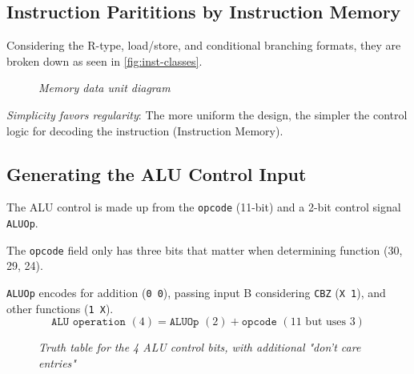 \documentclass[11pt]{article}
\begin{document}
\subsection*{Instruction Parititions by Instruction Memory}

Considering the R-type, load/store, and conditional branching formats, they are broken down as seen in \autoref{fig:inst-classes}.

\begin{figure}[htbp]
    \centering
    \caption{\textit{Memory data unit diagram}}
    \label{fig:inst-classes}
\end{figure}

\textit{Simplicity favors regularity}: The more uniform the design, the simpler the control logic for decoding the instruction (Instruction Memory).

\subsection*{Generating the ALU Control Input}

The ALU control is made up from the \texttt{opcode} (11-bit) and a 2-bit control signal \texttt{ALUOp}.

The \texttt{opcode} field only has three bits that matter when determining function (30, 29, 24).

\texttt{ALUOp} encodes for addition (\texttt{0 0}), passing input B considering \texttt{CBZ} (\texttt{X 1}), and other functions (\texttt{1 X}).
\vspace{-1em}
$$\texttt{ALU operation } (4) = \texttt{ALUOp }(2) + \texttt{opcode } (11 \text{ but uses } 3)$$

\begin{figure}[htbp]
    \centering
    \caption{\textit{Truth table for the 4 ALU control bits, with additional "don't care entries"}}
\end{figure}
\end{document}

